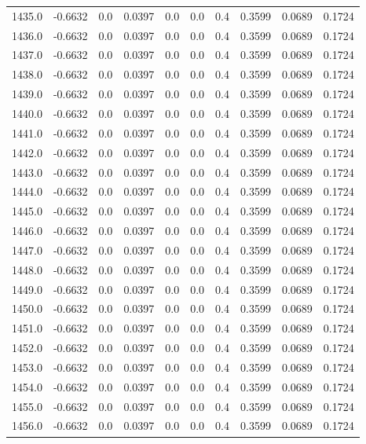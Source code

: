 \begin{longtable}{lrrrrrrrrr}
1435.0 & -0.6632 & 0.0 & 0.0397 & 0.0 & 0.0 & 0.4 & 0.3599 & 0.0689 & 0.1724 \\
1436.0 & -0.6632 & 0.0 & 0.0397 & 0.0 & 0.0 & 0.4 & 0.3599 & 0.0689 & 0.1724 \\
1437.0 & -0.6632 & 0.0 & 0.0397 & 0.0 & 0.0 & 0.4 & 0.3599 & 0.0689 & 0.1724 \\
1438.0 & -0.6632 & 0.0 & 0.0397 & 0.0 & 0.0 & 0.4 & 0.3599 & 0.0689 & 0.1724 \\
1439.0 & -0.6632 & 0.0 & 0.0397 & 0.0 & 0.0 & 0.4 & 0.3599 & 0.0689 & 0.1724 \\
1440.0 & -0.6632 & 0.0 & 0.0397 & 0.0 & 0.0 & 0.4 & 0.3599 & 0.0689 & 0.1724 \\
1441.0 & -0.6632 & 0.0 & 0.0397 & 0.0 & 0.0 & 0.4 & 0.3599 & 0.0689 & 0.1724 \\
1442.0 & -0.6632 & 0.0 & 0.0397 & 0.0 & 0.0 & 0.4 & 0.3599 & 0.0689 & 0.1724 \\
1443.0 & -0.6632 & 0.0 & 0.0397 & 0.0 & 0.0 & 0.4 & 0.3599 & 0.0689 & 0.1724 \\
1444.0 & -0.6632 & 0.0 & 0.0397 & 0.0 & 0.0 & 0.4 & 0.3599 & 0.0689 & 0.1724 \\
1445.0 & -0.6632 & 0.0 & 0.0397 & 0.0 & 0.0 & 0.4 & 0.3599 & 0.0689 & 0.1724 \\
1446.0 & -0.6632 & 0.0 & 0.0397 & 0.0 & 0.0 & 0.4 & 0.3599 & 0.0689 & 0.1724 \\
1447.0 & -0.6632 & 0.0 & 0.0397 & 0.0 & 0.0 & 0.4 & 0.3599 & 0.0689 & 0.1724 \\
1448.0 & -0.6632 & 0.0 & 0.0397 & 0.0 & 0.0 & 0.4 & 0.3599 & 0.0689 & 0.1724 \\
1449.0 & -0.6632 & 0.0 & 0.0397 & 0.0 & 0.0 & 0.4 & 0.3599 & 0.0689 & 0.1724 \\
1450.0 & -0.6632 & 0.0 & 0.0397 & 0.0 & 0.0 & 0.4 & 0.3599 & 0.0689 & 0.1724 \\
1451.0 & -0.6632 & 0.0 & 0.0397 & 0.0 & 0.0 & 0.4 & 0.3599 & 0.0689 & 0.1724 \\
1452.0 & -0.6632 & 0.0 & 0.0397 & 0.0 & 0.0 & 0.4 & 0.3599 & 0.0689 & 0.1724 \\
1453.0 & -0.6632 & 0.0 & 0.0397 & 0.0 & 0.0 & 0.4 & 0.3599 & 0.0689 & 0.1724 \\
1454.0 & -0.6632 & 0.0 & 0.0397 & 0.0 & 0.0 & 0.4 & 0.3599 & 0.0689 & 0.1724 \\
1455.0 & -0.6632 & 0.0 & 0.0397 & 0.0 & 0.0 & 0.4 & 0.3599 & 0.0689 & 0.1724 \\
1456.0 & -0.6632 & 0.0 & 0.0397 & 0.0 & 0.0 & 0.4 & 0.3599 & 0.0689 & 0.1724 \\

\end{longtable}
